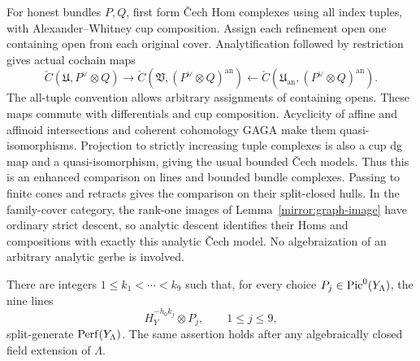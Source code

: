 For honest bundles $P,Q$, first form \v Cech Hom complexes using all
index tuples, with Alexander--Whitney cup composition.  Assign each
refinement open one containing open from each original cover.
Analytification followed by restriction gives actual cochain maps
\[
 \check C(\mathfrak U,P^\vee\otimes Q)
 \longrightarrow
 \check C(\mathfrak V,(P^\vee\otimes Q)^{\mathrm{an}})
 \longleftarrow
 \check C(\mathfrak U_{\mathrm{an}},
                         (P^\vee\otimes Q)^{\mathrm{an}}).
\]
The all-tuple convention allows arbitrary assignments of containing
opens.  These maps commute with differentials and cup composition.
Acyclicity of affine and affinoid intersections and coherent
cohomology GAGA make them quasi-isomorphisms.  Projection to strictly
increasing tuple complexes is also a cup dg map and a
quasi-isomorphism, giving the usual bounded \v Cech models.  Thus
this is an enhanced comparison on lines and bounded bundle
complexes.  Passing to finite cones and retracts gives the comparison
on their split-closed hulls.  In the family-cover category, the
rank-one images of Lemma~\ref{mirror:graph-image} have ordinary strict
descent, so analytic descent identifies their Homs and compositions
with exactly this analytic \v Cech model.  No algebraization of an
arbitrary analytic gerbe is involved.

\begin{lemma}
\label{mirror:generation}
There are integers $1\leq k_1<\cdots<k_9$ such that, for every
choice $P_j\in\operatorname{Pic}^0(Y_\Lambda)$, the nine lines
\[
 H_Y^{-h_0k_j}\otimes P_j,\qquad 1\leq j\leq9,
\]
split-generate $\operatorname{Perf}(Y_\Lambda)$.  The same assertion holds after
any algebraically closed field extension of $\Lambda$.
\end{lemma}

